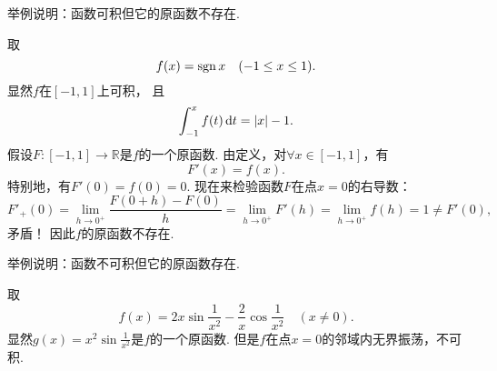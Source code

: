 \begin{example}
举例说明：函数可积但它的原函数不存在.
\begin{solution}
取\begin{equation*}
	f(x) = \operatorname{sgn} x
	\quad(-1 \leq x \leq 1).
\end{equation*}
显然\(f\)在\([-1,1]\)上可积，
且\begin{equation*}
	\int_{-1}^x f(t) \dd{t}
	= \abs{x} - 1.
\end{equation*}
假设\(F\colon[-1,1]\to\mathbb{R}\)是\(f\)的一个原函数.
由定义，对\(\forall x\in[-1,1]\)，有\begin{equation*}
	F'(x) = f(x).
\end{equation*}
特别地，有\(F'(0) = f(0) = 0\).
现在来检验函数\(F\)在点\(x=0\)的右导数：\begin{equation*}
	F'_+(0)
	= \lim_{h\to0^+} \frac{F(0+h)-F(0)}{h}
	= \lim_{h\to0^+} F'(h)
	= \lim_{h\to0^+} f(h)
	= 1
	\neq F'(0),
\end{equation*}
矛盾！
因此\(f\)的原函数不存在.
\end{solution}
\end{example}

\begin{example}
举例说明：函数不可积但它的原函数存在.
\begin{solution}
取\begin{equation*}
	f(x) = 2 x \sin\frac1{x^2} - \frac2x \cos\frac1{x^2}
	\quad(x\neq0).
\end{equation*}
显然\(g(x) = x^2 \sin\frac1{x^2}\)是\(f\)的一个原函数.
但是\(f\)在点\(x=0\)的邻域内无界振荡，不可积.
\end{solution}
\end{example}

